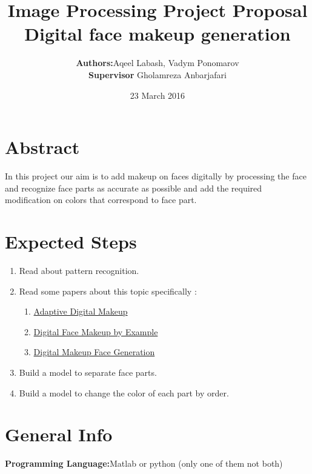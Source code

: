 \documentclass{article}
\title{Image Processing Project Proposal\\
Digital face makeup generation}
\author{\textbf{Authors:}Aqeel Labash, Vadym Ponomarov\\ 
	\textbf{Supervisor} Gholamreza Anbarjafari}
\date{23 March 2016}
\begin{document}
	\maketitle
\section*{Abstract}
In this project our aim is to add makeup on faces digitally by processing the face and recognize face parts as accurate as possible and add the required modification on colors that correspond to face part.
\section*{Expected Steps}
\begin{enumerate}
	\item Read about pattern recognition.
	\item Read some papers about this topic specifically : 
	\begin{enumerate}
		\item \href{http://users.cecs.anu.edu.au/~adhall/DhallSharmaBhattKhanISVC2009.pdf}{Adaptive Digital Makeup}
		\item \href{https://www.comp.nus.edu.sg/~tsim/documents/face_makeup_cvpr09_lowres.pdf}{Digital Face Makeup by Example}
		\item \href{http://web.stanford.edu/class/ee368/Project_Autumn_1516/Reports/Wut.pdf}{Digital Makeup Face Generation}
	\end{enumerate} 
	\item Build a model to separate face parts.
	\item Build a model to change the color of each part by order.
\end{enumerate}
\section*{General Info}
\textbf{Programming Language:}Matlab or python (only one of them not both)
\end{document}
